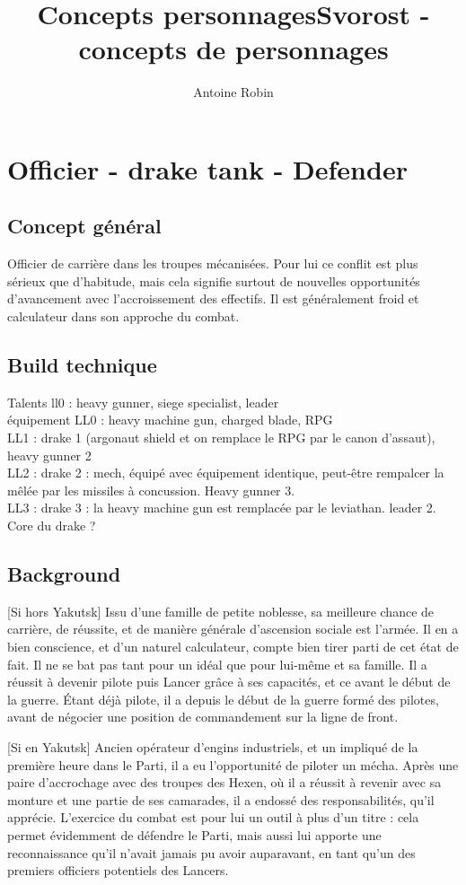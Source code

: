 \documentclass[10pt,a4paper]{article}
\author{ Antoine Robin}
\title{Concepts personnages}
\title{Svorost - concepts de personnages}
\begin{document}
\maketitle
\tableofcontents


\section{Officier - drake tank - Defender}
\subsection{Concept général}
Officier de carrière dans les troupes mécanisées. Pour lui ce conflit est plus sérieux que d'habitude, mais cela signifie surtout de nouvelles opportunités d'avancement avec l'accroissement des effectifs. Il est généralement froid et calculateur dans son approche du combat.
\subsection{Build technique}
Talents ll0 : heavy gunner, siege specialist, leader\\
équipement LL0 : heavy machine gun, charged blade, RPG\\
LL1 : drake 1 (argonaut shield et on remplace le RPG par le canon d'assaut), heavy gunner 2\\
LL2 : drake 2 : mech, équipé avec équipement identique, peut-être rempalcer la mêlée par les missiles à concussion. Heavy gunner 3.\\
LL3 : drake 3 : la heavy machine gun est remplacée par le leviathan. leader 2. Core du drake ?
\subsection{Background}
[Si hors Yakutsk] Issu d'une famille de petite noblesse, sa meilleure chance de carrière, de réussite, et de manière générale d'ascension sociale est l'armée. Il en a bien conscience, et d'un naturel calculateur, compte bien tirer parti de cet état de fait. Il ne se bat pas tant pour un idéal que pour lui-même et sa famille. Il a réussit à devenir pilote puis Lancer grâce à ses capacités, et ce avant le début de la guerre. Étant déjà pilote, il a depuis le début de la guerre formé des pilotes, avant de négocier une position de commandement sur la ligne de front.

[Si en Yakutsk] Ancien opérateur d'engins industriels, et un impliqué de la première heure dans le Parti, il a eu l'opportunité de piloter un mécha. Après une paire d'accrochage avec des troupes des Hexen, où il a réussit à revenir avec sa monture et une partie de ses camarades, il a endossé des responsabilités, qu'il apprécie. L'exercice du combat est pour lui un outil à plus d'un titre : cela permet évidemment de défendre le Parti, mais aussi lui apporte une reconnaissance qu'il n'avait jamais pu avoir auparavant, en tant qu'un des premiers officiers potentiels des Lancers.
\end{document}
